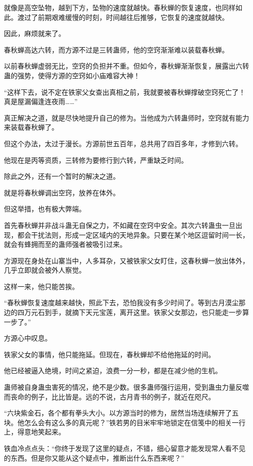 \begin{this_body}
就像是高空坠物，越到下方，坠物的速度就越快。春秋蝉的恢复速度，也同样如此。渡过了前期艰难缓慢的时刻，时间越往后推够，它恢复的速度就越快。

因此，麻烦就来了。

春秋蝉高达六转，而方源不过是三转蛊师，他的空窍渐渐难以装载春秋蝉。

以前春秋蝉虚弱无比，空窍的负担并不重。但如今，春秋蝉渐渐恢复，展露出六转蛊的强势，使得方源的空窍如小庙难容大神！

“这样下去，说不定在铁家父女查出真相之前，我就要被春秋蝉撑破空窍死亡了！真是屋漏偏逢连夜雨……”

真正解决之道，就是尽快地提升自己的修为。当他成为六转蛊师时，空窍就有能力来装载春秋蝉了。

但这个办法，太过于漫长。方源前世五百年，总共用了四百多年，才修到六转。

他现在是丙等资质，三转修为要修行到六转，严重缺乏时间。

除此之外，还有一个暂时的解决之道。

就是将春秋蝉调出空窍，放养在体外。

但这举措，也有极大弊端。

首先春秋蝉并非战斗蛊无自保之力，不如藏在空窍中安全。其次六转蛊虫一旦出现，都会干扰法则，形成一定区域内的天地异象。只要在某个地区逗留时间一长，就会有蜂拥而至的蛊师强者被吸引过来。

方源现在身处在山寨当中，人多耳杂，又被铁家父女盯住，这春秋蝉一放出体外，几乎立即就会被外人察觉。

这样一来，他只能苦挨。

“春秋蝉恢复速度越来越快，照此下去，恐怕我没有多少时间了。等到古月漠尘那边的四万元石到手，就摘下天元宝莲，离开这里。铁家父女那边，也只能走一步算一步了。”

方源心中叹息。

铁家父女的事情，他只能拖延。但现在，春秋蝉却不给他拖延的时间。

他已经被逼入绝境，时间之紧迫，浪费一分一秒，都是在减少他的生机。

蛊师被自身蛊虫害死的情况，绝不是少数。很多蛊师强行运用，受到蛊虫力量反噬而丧命的例子，比比皆是。远的不说，古月青书的例子，就近在咫尺。

“六块紫金石，各个都有拳头大小。以方源当时的修为，居然当场连续解开了五块。他怎么会有这么多的真元呢？”铁若男的目米牢牢地锁定在信笺中的相关一行上，得意地笑起来。

铁血冷点点头：“你终于发现了这里的疑点，不错，细心留意才能发现常人看不见的东西。但是你又能从这个疑点中，推断出什么东西来呢？”


\end{this_body}
